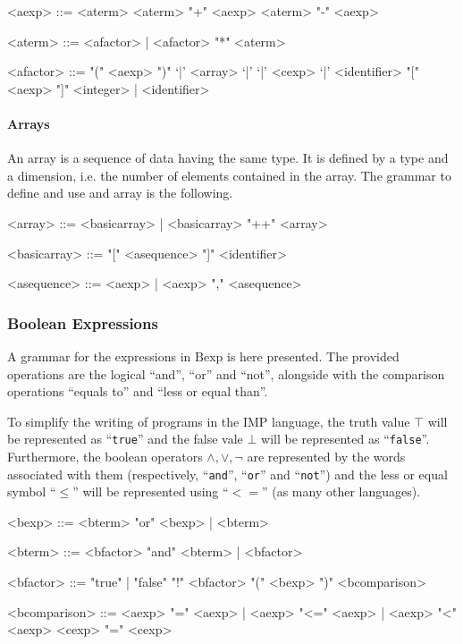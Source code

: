 \documentclass{esposito-documentation}
\begin{document}
\begin{grammar}
	<aexp> ::= <aterm>
	\alt <aterm> "+" <aexp>
	\alt <aterm> "-" <aexp>

	<aterm> ::= <afactor> | <afactor> "*" <aterm>

	<afactor> ::= "(" <aexp> ")"
	\alt `|' <array> `|'
	\alt `|' <cexp> `|'
	\alt <identifier> "[" <aexp> "]"
	\alt <integer> | <identifier>
\end{grammar}

\paragraph{Arrays}

An array is a sequence of data having the same type. It is defined by a type
and a dimension, i.e. the number of elements contained in the array. The
grammar to define and use and array is the following.

\begin{grammar}
	<array> ::= <basicarray> | <basicarray> "++" <array>

	<basicarray> ::= "[" <asequence> "]"
	\alt <identifier>

	<asequence> ::= <aexp> | <aexp> "," <asequence>
\end{grammar}

\subsubsection{Boolean Expressions}\label{sec:grammar-bexp}

A grammar for the expressions in $\mathrm{Bexp}$ is here presented. The
provided operations are the logical ``and'', ``or'' and ``not'', alongside with
the comparison operations ``equals to'' and ``less or equal than''.

To simplify the writing of programs in the IMP language, the truth value $\top$
will be represented as ``\texttt{true}'' and the false vale $\bot$ will be
represented as ``\texttt{false}''. Furthermore, the boolean operators $\land,
\vee, \neg$ are represented by the words associated with them (respectively,
``\texttt{and}'', ``\texttt{or}'' and ``\texttt{not}'') and the less or equal
symbol ``$\leq$'' will be represented using ``$<=$'' (as many other languages).

\begin{grammar}
	<bexp> ::= <bterm> "or" <bexp> | <bterm>

	<bterm> ::= <bfactor> "and" <bterm> | <bfactor>

	<bfactor> ::= "true" | "false"
	\alt "!" <bfactor>
	\alt "(" <bexp> ")"
	\alt <bcomparison>

	<bcomparison> ::= <aexp> "=" <aexp> | <aexp> "<=" <aexp> | <aexp> "<" <aexp>
	\alt <cexp> "=" <cexp>
\end{grammar}
\end{document}
